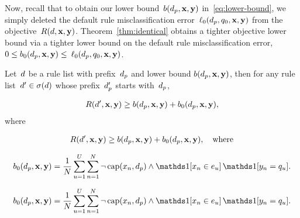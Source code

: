 Now, recall that to obtain our lower bound~${b(d_p, \mathbf{x}, \mathbf{y})}$
in~\eqref{eq:lower-bound}, we simply deleted the
default rule misclassification error~$\ell_0(d_p, q_0, \mathbf{x}, \mathbf{y})$
from the objective~${R({d}, \mathbf{x}, \mathbf{y})}$.
%
Theorem~\ref{thm:identical} obtains a tighter objective lower bound
via a tighter lower bound on the default rule misclassification error,
${0 \le b_0(d_p, \mathbf{x}, \mathbf{y}) \le}$ $\ell_0(d_p, q_0, \mathbf{x}, \mathbf{y})$.

\begin{theorem}
\label{thm:identical}
Let~${d}$ be a rule list with prefix~$d_p$
and lower bound ${b(d_p, \mathbf{x}, \mathbf{y})}$,
then for any rule list~${{d}' \in \sigma({d})}$
whose prefix~$d_p'$ starts with~$d_p$,
\begin{arxiv}
\begin{align}
R({d}', \mathbf{x}, \mathbf{y}) \ge b(d_p, \mathbf{x}, \mathbf{y}) + b_0(d_p, \mathbf{x}, \mathbf{y}),
\label{eq:identical}
\end{align}
where
\end{arxiv}
\begin{kdd}
\begin{align}
R({d}', \mathbf{x}, \mathbf{y}) \ge b(d_p, \mathbf{x}, \mathbf{y}) + b_0(d_p, \mathbf{x}, \mathbf{y}), \quad \text{where}
\end{align}
\end{kdd}
\begin{arxiv}
\begin{align}
b_0(\Prefix, \x, \y) = \frac{1}{N} \sum_{u=1}^U \sum_{n=1}^N
    \neg\, \Cap(x_n, \Prefix) \wedge \one [ x_n \in e_u ]\, \one [ y_n = q_u ].
\label{eq:lb-b0}
\end{align}
\end{arxiv}
\begin{kdd}
\begin{align}
b_0(\Prefix, \x, \y) = \frac{1}{N} \sum_{u=1}^U \sum_{n=1}^N
    \neg\, \Cap(x_n, \Prefix) \wedge \one [ x_n \in e_u ]\, \one [ y_n = q_u ]. \nn
\end{align}
\end{kdd}
\end{theorem}

